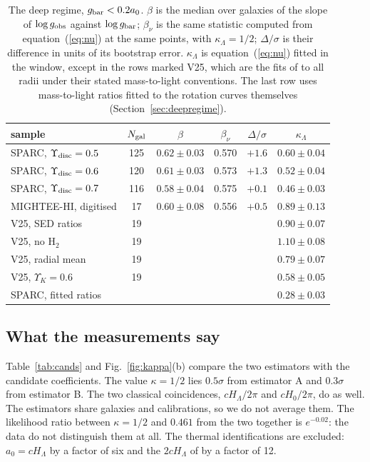 \documentclass[fleqn,usenatbib]{mnras}
\begin{document}
\begin{table}
\caption{The deep regime, $g_{\rm bar}<0.2a_0$. $\beta$ is the median over galaxies of the slope of $\log g_{\rm obs}$ against $\log g_{\rm bar}$; $\beta_\nu$ is the same statistic computed from equation~(\ref{eq:nu}) at the same points, with $\kappa_\Lambda=1/2$; $\Delta/\sigma$ is their difference in units of its bootstrap error. $\kappa_\Lambda$ is equation~(\ref{eq:nu}) fitted in the window, except in the rows marked V25, which are the fits of \citet{Varasteanu2025} to all radii under their stated mass-to-light conventions. The last row uses mass-to-light ratios fitted to the rotation curves themselves (Section~\ref{sec:deepregime}).}
\label{tab:deep}
\setlength{\tabcolsep}{3.5pt}
\begin{tabular}{@{}lccccc@{}}
\toprule
sample & $N_{\rm gal}$ & $\beta$ & $\beta_\nu$ & $\Delta/\sigma$ & $\kappa_\Lambda$\\
\midrule
SPARC, $\Upsilon_{\rm disc}=0.5$ & 125 & $0.62\pm0.03$ & 0.570 & $+1.6$ & $0.60\pm0.04$\\
SPARC, $\Upsilon_{\rm disc}=0.6$ & 120 & $0.61\pm0.03$ & 0.573 & $+1.3$ & $0.52\pm0.04$\\
SPARC, $\Upsilon_{\rm disc}=0.7$ & 116 & $0.58\pm0.04$ & 0.575 & $+0.1$ & $0.46\pm0.03$\\
MIGHTEE-HI, digitised & 17 & $0.60\pm0.08$ & 0.556 & $+0.5$ & $0.89\pm0.13$\\
\midrule
V25, SED ratios & 19 & & & & $0.90\pm0.07$\\
V25, no H$_2$ & 19 & & & & $1.10\pm0.08$\\
V25, radial mean & 19 & & & & $0.79\pm0.07$\\
V25, $\Upsilon_K=0.6$ & 19 & & & & $0.58\pm0.05$\\
\midrule
SPARC, fitted ratios & & & & & $0.28\pm0.03$\\
\bottomrule
\end{tabular}
\end{table}

\subsection{What the measurements say}
Table~\ref{tab:cands} and Fig.~\ref{fig:kappa}(b) compare the two estimators with the candidate coefficients. The value $\kappa=1/2$ lies $0.5\sigma$ from estimator A and $0.3\sigma$ from estimator B. The two classical coincidences, $cH_\Lambda/2\pi$ and $cH_0/2\pi$, do as well. The estimators share galaxies and calibrations, so we do not average them. The likelihood ratio between $\kappa=1/2$ and $0.461$ from the two together is $e^{-0.02}$: the data do not distinguish them at all. The thermal identifications are excluded: $a_0=cH_\Lambda$ by a factor of six and the $2cH_\Lambda$ of \citet{Milgrom1999} by a factor of 12.
\end{document}
